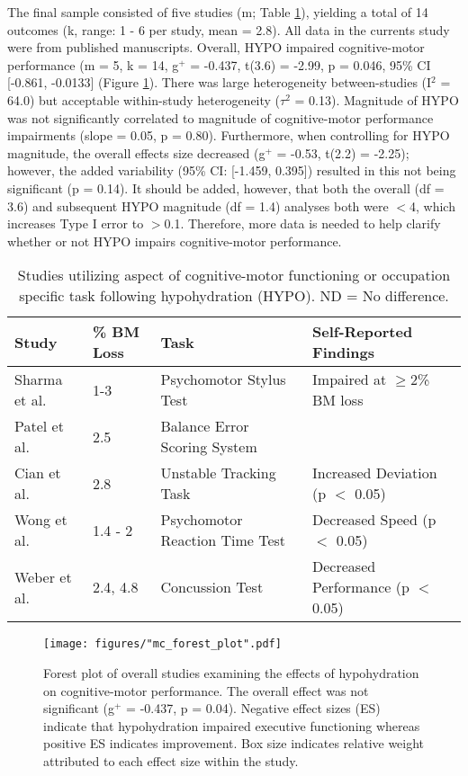 The final sample consisted of five studies (m; Table \ref{tbl:m_c_studies}), yielding a total of 14 outcomes (k, range: 1 - 6 per study, mean = 2.8). All data in the currents study were from published manuscripts. Overall, HYPO impaired cognitive-motor performance (m = 5, k = 14, g${^+}$ = -0.437, t(3.6) = -2.99, p = 0.046, 95\% CI [-0.861, -0.0133] (Figure \ref{fig:mc_forest}). There was large heterogeneity between-studies (I${^2}$ = 64.0) but acceptable within-study heterogeneity (${\tau}$${^2}$ = 0.13). Magnitude of HYPO was not significantly correlated to magnitude of cognitive-motor performance impairments (slope = 0.05, p = 0.80). Furthermore, when controlling for HYPO magnitude, the overall effects size decreased (g${^+}$ = -0.53, t(2.2) = -2.25); however, the added variability (95\% CI: [-1.459, 0.395]) resulted in this not being significant (p = 0.14). It should be added, however, that both the overall (df = 3.6) and subsequent HYPO magnitude (df = 1.4) analyses both were ${<}$4, which increases Type I error to ${>}$0.1. Therefore, more data is needed to help clarify whether or not HYPO impairs cognitive-motor performance.   

\begin{table}
	\caption{Studies utilizing aspect of cognitive-motor functioning or occupation specific task following hypohydration (HYPO). ND = No difference.}
	\centering
	\begin{tabular}{llll} 
		\hline
		\textbf{Study} & \textbf{\% BM Loss} & \textbf{Task} & \textbf{Self-Reported Findings} \\
		\hline
		Sharma et al. \cite{sharma_influence_1986} & 1-3 & Psychomotor Stylus Test & Impaired at ${\ge}$2\% BM loss \\
		Patel et al. \cite{patel_neuropsychological_2007} & 2.5 & Balance Error Scoring System & \textemdash \\
		Cian et al. \cite{cian_influence_2000} & 2.8 & Unstable Tracking Task & Increased Deviation (p ${<}$ 0.05) \\
		Wong et al. \cite{wong_effects_2014} & 1.4 - 2 & Psychomotor Reaction Time Test & Decreased Speed (p ${<}$ 0.05) \\
		Weber et al. \cite{weber_dehydration_2013} & 2.4, 4.8 & Concussion Test & Decreased Performance (p ${<}$ 0.05) \\
		\hline		    
	\end{tabular}
	\label{tbl:m_c_studies}
\end{table}


\begin{figure}
	\texttt{[image: figures/"mc\_forest\_plot".pdf]}
	\caption{Forest plot of overall studies examining the effects of hypohydration on cognitive-motor performance. The overall effect was not significant (g${^+}$ = -0.437, p = 0.04). Negative effect sizes (ES) indicate that hypohydration impaired executive functioning whereas positive ES indicates improvement. Box size indicates relative weight attributed to each effect size within the study.}
	\label{fig:mc_forest}
\end{figure}

